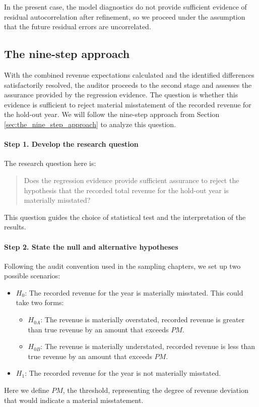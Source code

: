 In the present case, the model diagnostics do not provide sufficient evidence of residual autocorrelation after refinement, so we proceed under the assumption that the future residual errors are uncorrelated.


\subsection{The nine-step approach} %
\label{sub:the_nine_step_approach}

With the combined revenue expectations calculated and the identified differences satisfactorily resolved, the auditor proceeds to the second stage and assesses the assurance provided by the regression evidence. The question is whether this evidence is sufficient to reject material misstatement of the recorded revenue for the hold-out year.
We will follow the nine-step approach from Section \ref{sec:the_nine_step_approach} to analyze this question.

\paragraph{Step 1. Develop the research question}
The research question here is: 
\begin{quote}
Does the regression evidence provide sufficient assurance to reject the hypothesis that the recorded total revenue for the hold-out year is materially misstated?
\end{quote}
This question guides the choice of statistical test and the interpretation of the results.

\paragraph{Step 2. State the null and alternative hypotheses}
Following the audit convention used in the sampling chapters, we set up two possible scenarios:
\begin{itemize}
    \item $H_0$: The recorded revenue for the year is materially misstated. This could take two forms:
    \begin{itemize}
        \item $H_{0A}$: The revenue is materially overstated, recorded revenue is greater than true revenue by an amount that exceeds $PM$.
        \item $H_{0B}$: The revenue is materially understated, recorded revenue is less than true revenue by an amount that exceeds $PM$.
    \end{itemize}
    \item $H_1$: The recorded revenue for the year is not materially misstated.
\end{itemize}
Here we define $PM$, the  threshold, representing the degree of revenue deviation that would indicate a material misstatement.

